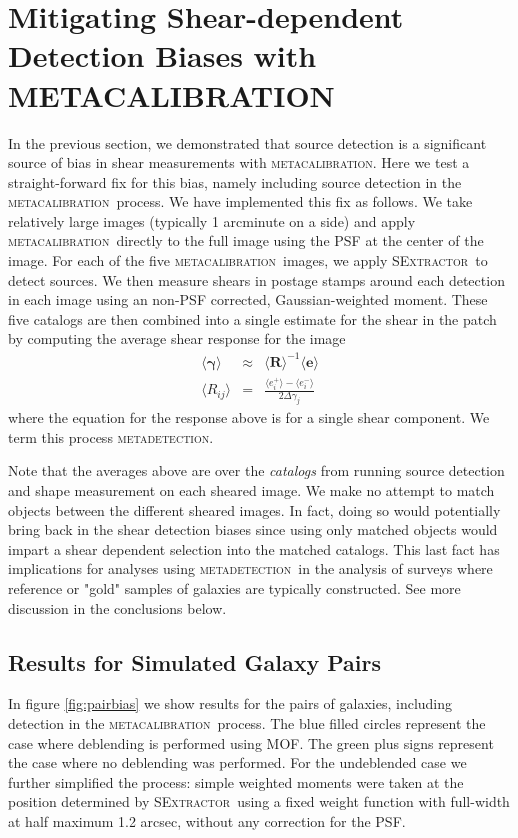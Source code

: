 \documentclass[fleqn,useAMS,usenatbib]{mnras}
\newcommand{\mcal}{\textsc{metacalibration}}
\newcommand{\mdet}{\textsc{metadetection}}
\newcommand{\sx}{\textsc{SExtractor}}
\begin{document}
\section{Mitigating Shear-dependent Detection Biases with \textsc{METACALIBRATION}}

In the previous section, we demonstrated that source detection is a significant
source of bias in shear measurements with \mcal. Here we test a straight-forward
fix for this bias, namely including source detection in the \mcal\ process. We
have implemented this fix as follows. We take relatively large images (typically
1 arcminute on a side) and apply \mcal\ directly to the full image using the
PSF at the center of the image. For each of the five \mcal\ images, we apply
\sx\ to detect sources. We then measure shears in postage stamps around each
detection in each image using an non-PSF corrected, Gaussian-weighted moment.
These five catalogs are then combined into a single estimate for the shear in
the patch by computing the average shear response for the image
\begin{eqnarray}
\langle \boldsymbol\gamma \rangle &\approx& \langle \boldsymbol{R}\rangle^{-1}\langle\boldsymbol{e}\rangle\\
\langle R_{ij}\rangle &=& \frac{\langle e_i^{+}\rangle - \langle e_i^{-}\rangle}{2\Delta\gamma_j}
\end{eqnarray}
where the equation for the response above is for a single shear component. We term this
process \mdet.

Note that the averages above are over the {\it catalogs} from running source detection
and shape measurement on each sheared image. We make no attempt to match objects between the different
sheared images. In fact, doing so would potentially bring back in the shear
detection biases since using only matched objects would impart a shear dependent
selection into the matched catalogs. This last fact has implications for
analyses using \mdet\ in the analysis of surveys where reference or "gold"
samples of galaxies are typically constructed. See more discussion in the
conclusions below.

\subsection{Results for Simulated Galaxy Pairs}
\label{sec:mdetpairs}

In figure \ref{fig:pairbias} we show results for the pairs of galaxies, including
detection in the \mcal\ process. The blue filled circles represent the case
where deblending is performed using MOF. The green plus signs represent the
case where no deblending was performed. For the undeblended case we further
simplified the process: simple weighted moments were taken at the position
determined by \sx\ using a fixed weight function with full-width at half
maximum 1.2 arcsec, without any correction for the PSF.
\end{document}
